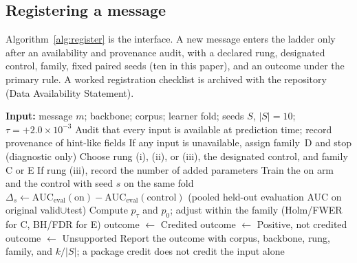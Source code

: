 \subsection{Registering a message}
\label{sec:protocol-register}
Algorithm~\ref{alg:register} is the interface. A new message enters
the ladder only after an availability and provenance audit, with a
declared rung, designated control, family, fixed paired seeds (ten in
this paper), and an outcome under the primary rule. A worked registration
checklist is archived with the repository (Data Availability Statement).

\begin{algorithm}[t]
\caption{Register a message on the credit ladder.}
\label{alg:register}
\begin{algorithmic}[1]
\STATE \textbf{Input:} message $m$; backbone; corpus; learner fold; seeds $S$, $|S|{=}10$; $\tau{=}{+}2.0\times 10^{-3}$
\STATE Audit that every input is available at prediction time; record provenance of hint-like fields
\STATE If any input is unavailable, assign family~D and stop (diagnostic only)
\STATE Choose rung (i), (ii), or (iii), the designated control, and family C or E
\STATE If rung (iii), record the number of added parameters
  \STATE Train the on arm and the control with seed $s$ on the same fold
  \STATE $\Delta_s\gets\mathrm{AUC}_{\mathrm{eval}}(\mathrm{on})-\mathrm{AUC}_{\mathrm{eval}}(\mathrm{control})$
  \STATE \quad (pooled held-out evaluation AUC on original valid$\cup$test)
\ENDFOR
\STATE Compute $p_\tau$ and $p_0$; adjust within the family (Holm/FWER for C, BH/FDR for E)
  \STATE outcome $\gets$ Credited
  \STATE outcome $\gets$ Positive, not credited
\ELSE
  \STATE outcome $\gets$ Unsupported
\ENDIF
\STATE Report the outcome with corpus, backbone, rung, family, and $k/|S|$; a package credit does not credit the input alone
\end{algorithmic}
\end{algorithm}
